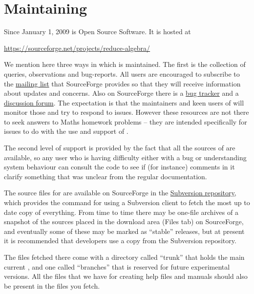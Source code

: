 \chapter {Maintaining {\REDUCE}}

Since January 1, 2009 {\REDUCE} is Open Source Software. It is hosted at
\begin{center}
  \url{https://sourceforge.net/projects/reduce-algebra/}
\end{center}
We mention here three ways in which {\REDUCE} is maintained. The first is
the collection of queries, observations and bug-reports. All users are
encouraged to subscribe to the
\href{https://sourceforge.net/p/reduce-algebra/mailman/}{mailing list}
that SourceForge provides so that they will receive information
about updates and concerns. Also on SourceForge there is a
\href{https://sourceforge.net/p/reduce-algebra/bugs/}{bug tracker}
and a
\href{https://sourceforge.net/p/reduce-algebra/discussion/}{discussion forum}.
The expectation is that the maintainers and keen users of {\REDUCE}
will monitor those and try to respond to issues. However these
resources are not there to seek answers to Maths homework problems --
they are intended specifically for issues to do with the use and
support of {\REDUCE}.

The second level of support is provided by the fact that all the sources of 
{\REDUCE} are available, so any user who is having difficulty either with a bug 
or understanding system behaviour can consult the code to see if (for 
instance) comments in it clarify something that was unclear from the regular 
documentation.

The source files for {\REDUCE} are available on SourceForge in the
\href{https://sourceforge.net/p/reduce-algebra/code/}{Subversion
  repository}, which provides the command for using a Subversion
client to fetch the most up to date copy of everything. From time to
time there may be one-file archives of a snapshot of the sources
placed in the download area (Files tab) on SourceForge, and eventually
some of these may be marked as ``stable'' releases, but at present it
is recommended that developers use a copy from the Subversion
repository.

The files fetched there come with a directory called ``trunk'' that holds the 
main current {\REDUCE}, and one called ``branches'' that is reserved for future 
experimental versions. All the files that we have for creating help files and 
manuals should also be present in the files you fetch.

